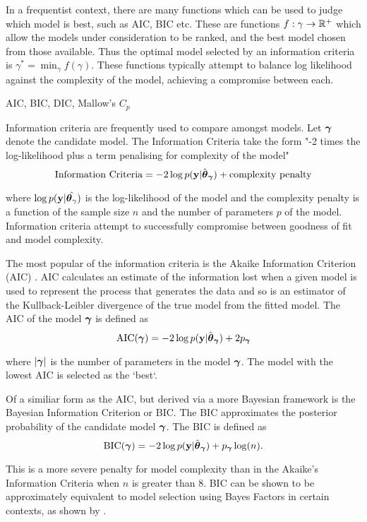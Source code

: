 \documentclass{amsart}[12pt]
\newcommand{\mgc}[1]{{\color{blue}#1}}
\begin{document}
In a frequentist context, there are many functions which can be used to judge which model is best,
such as AIC, BIC etc. These are functions $f: \gamma \to {\mathbb{R}}^+$ which allow the models under consideration to
be ranked, and the best model chosen from those available. Thus the optimal model selected by an information
criteria is	$\gamma^* = \min_\gamma f(\gamma)$. These functions typically attempt to balance log likelihood 
against the complexity of the model, achieving a compromise between each.

\mgc{AIC, BIC, DIC, Mallow's $C_p$}

Information criteria are frequently used to compare amongst models. Let ${\boldsymbol \gamma}$ denote the candidate model.
The Information Criteria take the form "-2 times the log-likelihood plus a term penalising for complexity of
the model"
\[
	\text{Information Criteria} = -2 \log p({\bf y} | \hat{{\boldsymbol \theta}}_{\boldsymbol \gamma}) + \text{complexity penalty}
\]

where $\log p({\bf y} | \hat{{\boldsymbol \theta}_\gamma})$ is the log-likelihood of the model and the complexity penalty is
a function of the sample size $n$ and the number of parameters $p$ of the model. Information criteria attempt
to successfully compromise between goodness of fit and model complexity.

The most popular of the information criteria is the Akaike Information Criterion (AIC) \cite{Akaike1974}. AIC
calculates an estimate of the information lost when a given model is used to represent the process that
generates the data and so is an estimator of the Kullback-Leibler divergence of the true model from the fitted
model. The AIC of the model ${\boldsymbol \gamma}$ is defined as
\[
	\text{AIC}({\boldsymbol \gamma}) = -2 \log p({\bf y} | \hat{{\boldsymbol \theta}}_{\boldsymbol \gamma}) + 2 p_{\boldsymbol \gamma}
\]

where $|{\boldsymbol \gamma}|$ is the number of parameters in the model ${\boldsymbol \gamma}$. The model with the lowest AIC is selected
as the `best`.

Of a similiar form as the AIC, but derived via a more Bayesian framework is the Bayesian Information Criterion
or BIC. The BIC approximates the posterior probability of the candidate model ${\boldsymbol \gamma}$. The BIC is defined as
\[
	\text{BIC}({\boldsymbol \gamma}) = -2 \log p({\bf y} | \hat{{\boldsymbol \theta}}_{\boldsymbol \gamma}) + p_{\boldsymbol \gamma} \log(n).
\]

This is a more severe penalty for model complexity than in the Akaike's Information Criteria when $n$ is
greater than $8$. BIC can be shown to be approximately equivalent to model selection using Bayes Factors
in certain contexts, as shown by \cite{Kass1993}.
\end{document}
